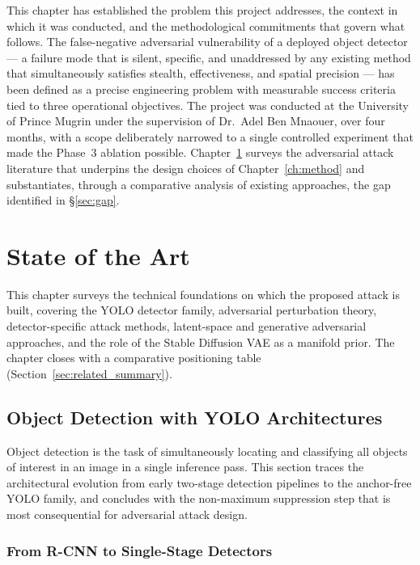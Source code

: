 \documentclass[12pt,a4paper]{report}
\begin{document}
This chapter has established the problem this project
addresses, the context in which it was conducted, and the
methodological commitments that govern what follows. The
false-negative adversarial vulnerability of a deployed
object detector --- a failure mode that is silent, specific,
and unaddressed by any existing method that simultaneously
satisfies stealth, effectiveness, and spatial precision ---
has been defined as a precise engineering problem with
measurable success criteria tied to three operational
objectives. The project was conducted at the University of
Prince Mugrin under the supervision of Dr.~Adel Ben Mnaouer,
over four months, with a scope deliberately narrowed to a
single controlled experiment that made the Phase~3 ablation
possible. Chapter~\ref{ch:background} surveys the adversarial
attack literature that underpins the design choices of
Chapter~\ref{ch:method} and substantiates, through a
comparative analysis of existing approaches, the gap
identified in \S\ref{sec:gap}.


\chapter{State of the Art}
\label{ch:background}

This chapter surveys the technical foundations on which the proposed attack is built, covering the YOLO detector family, adversarial perturbation theory, detector-specific attack methods, latent-space and generative adversarial approaches, and the role of the Stable Diffusion VAE as a manifold prior. The chapter closes with a comparative positioning table (Section~\ref{sec:related_summary}).

\section{Object Detection with YOLO Architectures}
\label{sec:yolo}

Object detection is the task of simultaneously locating and classifying
all objects of interest in an image in a single inference pass. This
section traces the architectural evolution from early two-stage detection
pipelines to the anchor-free YOLO family, and concludes with the
non-maximum suppression step that is most consequential for adversarial
attack design.

\subsection{From R-CNN to Single-Stage Detectors}
\end{document}
